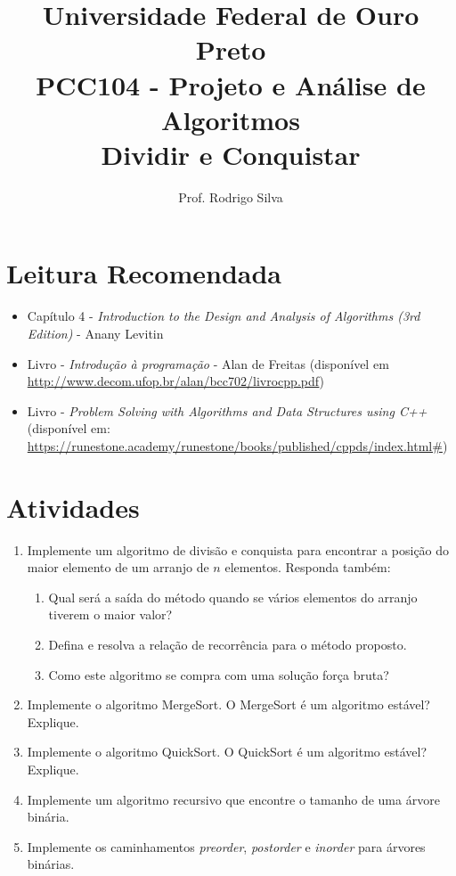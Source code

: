 \documentclass{article}
\title{\vspace{-2 cm}Universidade Federal de Ouro Preto \\ PCC104 - Projeto e Análise de Algoritmos \\ Dividir e Conquistar}
\author{Prof. Rodrigo Silva}
\begin{document}
\maketitle

\section{Leitura Recomendada}

\begin{itemize}
    \item Capítulo 4 - \textit{Introduction to the Design and Analysis of Algorithms (3rd Edition)} - Anany Levitin 
    \item Livro - \textit{Introdução à programação} - Alan de Freitas (disponível em \url{http://www.decom.ufop.br/alan/bcc702/livrocpp.pdf})
    \item Livro - \textit{Problem Solving with Algorithms and Data Structures using C++} (disponível em: \url{https://runestone.academy/runestone/books/published/cppds/index.html#})
\end{itemize}


\section{Atividades}

\begin{enumerate}
    \item Implemente um algoritmo de divisão e conquista para encontrar a posição do maior elemento de um arranjo de $n$ elementos. Responda também: %
    \begin{enumerate} 
        \item Qual será a saída do método quando se vários elementos do arranjo tiverem o maior valor?
        \item Defina e resolva a relação de recorrência para o método proposto.
        \item Como este algoritmo se compra com uma solução força bruta?
    \end{enumerate}
    \item Implemente o algoritmo MergeSort. O MergeSort é um algoritmo estável? Explique.
    \item Implemente o algoritmo QuickSort. O QuickSort é um algoritmo estável? Explique.
    \item Implemente um algoritmo recursivo que encontre o tamanho de uma árvore binária.
    \item Implemente os caminhamentos \textit{preorder}, \textit{postorder} e \textit{inorder} para árvores binárias.
     
\end{enumerate}
\end{document}
